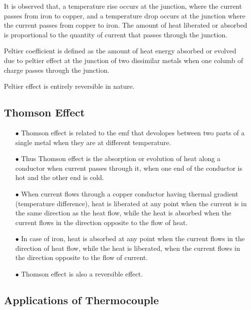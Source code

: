 It is observed that, a temperature rise occurs at the junction, where the current passes from iron to copper, and a temperature drop occurs at the junction where the current passes from copper to iron. The amount of heat liberated or absorbed is proportional to the quantity of current that passes through the junction.

Peltier coefficient is defined as the amount of heat energy absorbed or evolved due to peltier effect at the junction of two dissimilar metals when one columb of charge passes through the junction.

Peltier effect is entirely reversible in nature.

\vfill\eject

\subsection{Thomson Effect}\label{sec8.13.3}
\begin{itemize}
\item[$\bullet$] Thomson effect is related to the emf that devolopes between two parts of a single metal when they are at different temperature.

\item[$\bullet$] Thus Thomson effect is the absorption or evolution of heat along a conductor when current passes through it, when one end of the conductor is hot and the other end is cold.

\item[$\bullet$] When current flows through a copper conductor having thermal gradient (temperature difference), heat is liberated at any point when the current is in the same direction as the heat flow, while the heat is absorbed when the current flows in the direction opposite to the flow of heat.

\item[$\bullet$] In case of iron, heat is absorbed at any point when the current flows in the direction of heat flow, while the heat is liberated, when the current flows in the direction opposite to the flow of current.

\item[$\bullet$] Thomson effect is also a reversible effect.
\end{itemize}

\subsection{Applications of Thermocouple}\label{sec8.13.4}

